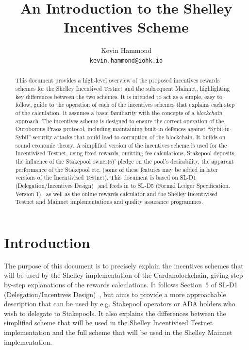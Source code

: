 \documentclass[11pt,a4paper,dvipsnames,twosided,final]{article}
\newcommand{\ada}{ADA{}}
\newcommand{\cardano}[1]{Cardano}
\begin{document}
\renewcommand{\thepage}{\arabic{page}}
\setcounter{page}{1}

\title{An Introduction to the Shelley Incentives Scheme}

\author{Kevin Hammond  \\ {\small \texttt{kevin.hammond@iohk.io}}}

\maketitle

\begin{abstract}
  \noindent
  This document provides a high-level overview of the proposed incentives rewards schemes for
  the Shelley Incentived Testnet and the subsequent Mainnet, highlighting key
  differences between the two schemes.  It is intended to act as a
  simple, easy to follow, guide to the operation of each of the incentives schemes that explains each step of the calculation.
  It assumes a basic familiarity with the concepts of a \emph{blockchain} approach.
  The incentives scheme is designed to ensure the correct operation of the Ouroborous Praos
  protocol, including maintaining built-in defences against ``Sybil-in-Sybil'' security attacks
  that could lead to corruption of the blockchain.  It builds on sound economic theory.
  A simplified version of the incentives scheme is used for the Incentivised Testnet, using fixed rewards,
  omitting fee calculations, Stakepool deposits, the influence of the Stakepool owner(s)' pledge on
  the pool's desirability, the apparent performance of the Stakepool etc. (some of these features may be
  added in later versions of the Incentivised Testnet).
  This document is based on SL-D1 (Delegation/Incentives Design)~\cite{delegation_design} and feeds in to SL-D5
  (Formal Ledger Specification. Version 1)~\cite{shelley_spec} as well as the online rewards calculator and the Shelley Incentivised Testnet and Mainnet  implementations and quality assurance programmes.
\end{abstract}

\clearpage
\section{Introduction}
\label{sec:introduction}

The purpose of this document is to precisely explain the incentives schemes that will be used by the Shelley implementation
of the \cardano blockchain, giving step-by-step explanations of the rewards calculations.
It follows Section~5 of SL-D1 (Delegation/Incentives Design)~\cite{delegation_design}, but aims to provide a more approachable
description that can be used by e.g. Stakepool operators or \ada{} holders who wish to delegate to Stakepools.
It also explains the differences between the simplified scheme that will be used in the Shelley Incentivised Testnet implementation and the
full scheme that will be used in the Shelley Mainnet implementation.
\end{document}
